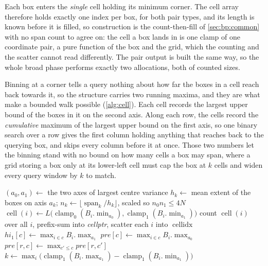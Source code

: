 Each box enters the \emph{single} cell holding its minimum corner. The cell
array therefore holds exactly one index per box, for both pair types, and its
length is known before it is filled, so construction is the count-then-fill of
\cref{sec:bp:common} with no span count to agree on: the cell a box lands in is
one clamp of one coordinate pair, a pure function of the box and the grid, which
the counting and the scatter cannot read differently. The pair output is built
the same way, so the whole broad phase performs exactly two allocations, both of
counted sizes.

Binning at a corner tells a query nothing about how far the boxes in a cell
reach back towards it, so the structure carries two running maxima, and they are
what make a bounded walk possible (\cref{alg:cell}). Each cell records the
largest upper bound of the boxes in it on the second axis. Along each row, the
cells record the \emph{cumulative} maximum of the largest upper bound on the
first axis, so one binary search over a row gives the first column holding
anything that reaches back to the querying box, and skips every column before it
at once. Those two numbers let the binning stand with no bound on how many cells
a box may span, where a grid storing a box only at its lower-left cell must cap
the box at $k$ cells and widen every query window by $k$ to match.

\begin{algorithm}[htbp]
\caption{Building the cell list, shared by both queries}
\label{alg:cell}
\small
\begin{algorithmic}[1]
  \State $(a_{0},a_{1}) \gets$ the two axes of largest centre variance
  \State $h_{k} \gets$ mean extent of the boxes on axis $a_{k}$;\quad
         $n_{k} \gets \lfloor \operatorname{span}_{k}/h_{k} \rfloor$,
         scaled so $n_{0}n_{1} \le 4N$
  \State $\operatorname{cell}(i) \gets L\bigl(\operatorname{clamp}_{0}(B_{i}.\min_{a_{0}}),
         \operatorname{clamp}_{1}(B_{i}.\min_{a_{1}})\bigr)$
  \State count $\operatorname{cell}(i)$ over all $i$, prefix-sum into \textit{cellptr},
         scatter each $i$ into $\operatorname{cellidx}$
    \State $\mathit{hi}_{1}[c] \gets \max_{i \in c} B_{i}.\max_{a_{1}}$
    \State $\mathit{pre}[c] \gets \max_{i \in c} B_{i}.\max_{a_{0}}$
  \EndFor
    \State $\mathit{pre}[r,c] \gets \max_{c' \le c} \mathit{pre}[r,c']$
  \EndFor
  \State $k \gets \max_{i} \bigl(\operatorname{clamp}_{1}(B_{i}.\max_{a_{1}})
         - \operatorname{clamp}_{1}(B_{i}.\min_{a_{1}})\bigr)$
\EndFunction
\end{algorithmic}
\end{algorithm}

